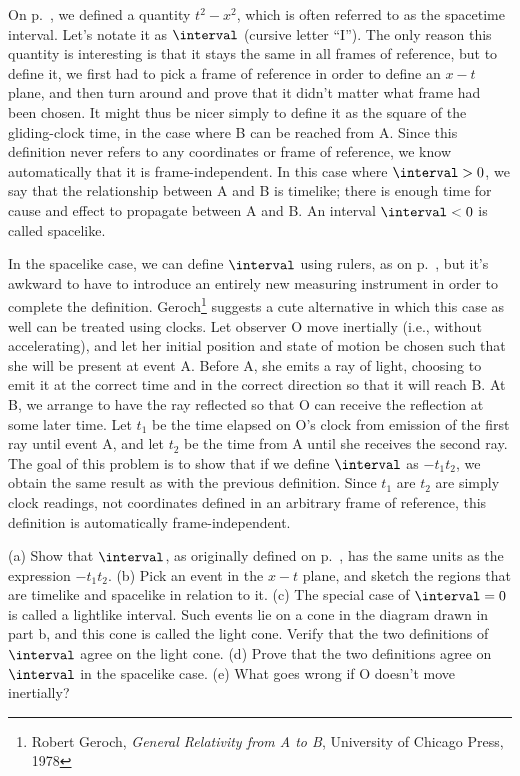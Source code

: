 On p.~\pageref{subsec:proper-time}, we defined a quantity $t^2-x^2$, which is
often referred to as the spacetime interval.
Let's notate it as $\interval$ (cursive letter ``I''). The only reason this quantity is interesting is that it stays
the same in all frames of reference, but to define it, we first had to pick a frame
of reference in order to define an $x-t$ plane, and then turn around and prove that it didn't matter
what frame had been chosen. It might thus be nicer simply to define it as the
square of the gliding-clock time, in the case where B can be reached from A. Since this definition
never refers to any coordinates or frame of reference, we know automatically that it is
frame-independent. In this case where $\interval>0$, we say that the relationship between A and 
B is timelike;
there is enough time for cause and effect to propagate between A and B. An interval
$\interval<0$ is called spacelike.

In the spacelike case, we can define $\interval$ using rulers, as 
on p.~\pageref{interval-using-ruler}, but it's awkward to have to introduce an entirely
new measuring instrument in order to complete the 
definition. Geroch\footnote{Robert Geroch, \emph{General Relativity from A to B}, University of Chicago Press, 1978}
suggests a cute alternative in which this case as well can be treated using clocks.
Let observer O move inertially (i.e., without accelerating), and let her initial position and state of motion
be chosen such that she will be present at event A. Before A, she emits a ray of light, choosing to emit it
at the correct time and in the correct direction so that it will reach B. At B, we arrange to have the ray
reflected so that O can receive the reflection at some later time. Let $t_1$ be the time elapsed on O's clock
from emission of the first ray until event A, and let $t_2$ be the time from A until she receives the second
ray. The goal of this problem is to show that if we define $\interval$ as $-t_1 t_2$, we obtain the same
result as with the previous definition. Since $t_1$ are $t_2$ are simply clock readings, not coordinates
defined in an arbitrary frame of reference, this definition is automatically frame-independent.

(a) Show that $\interval$, as originally defined on p.~\pageref{subsec:proper-time},
    has the same units as the expression $-t_1 t_2$.\hwendpart
(b) Pick an event in the $x-t$ plane, and sketch the regions that are timelike and spacelike in relation to it.\hwendpart
(c) The special case of $\interval=0$ is called a lightlike interval. Such events
    lie on a cone in the diagram drawn in part b, and this cone is called the light cone.
    Verify that the two definitions of $\interval$ agree on the light cone.\hwendpart
(d) Prove that the two definitions agree on $\interval$ in the spacelike case.
(e) What goes wrong if O doesn't move inertially?
